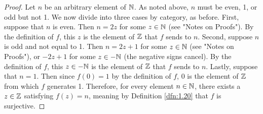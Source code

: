 \documentclass[../main.tex]{subfiles}
\begin{document}
\begin{exercise}
\begin{proof}
        Let $n$ be an arbitrary element of $\mathbb{N}$. As noted above, $n$ must be even, 1, or odd but not 1. We now divide into three cases by category, as before. First, suppose that $n$ is even. Then $n=2z$ for some $z\in\mathbb{N}$ (see "Notes on Proofs"). By the definition of $f$, this $z$ is the element of $\mathbb{Z}$ that $f$ sends to $n$. Second, suppose $n$ is odd and not equal to 1. Then $n=2z+1$ for some $z\in\mathbb{N}$ (see "Notes on Proofs"), or $-2z+1$ for some $z\in-\mathbb{N}$ (the negative signs cancel). By the definition of $f$, this $z\in-\mathbb{N}$ is the element of $\mathbb{Z}$ that $f$ sends to $n$. Lastly, suppose that $n=1$. Then since $f(0)=1$ by the definition of $f$, 0 is the element of $\mathbb{Z}$ from which $f$ generates 1. Therefore, for every element $n\in\mathbb{N}$, there exists a $z\in\mathbb{Z}$ satisfying $f(z)=n$, meaning by Definition \ref{dfn:1.20} that $f$ is surjective.
    \end{proof}
\end{exercise}
\end{document}
